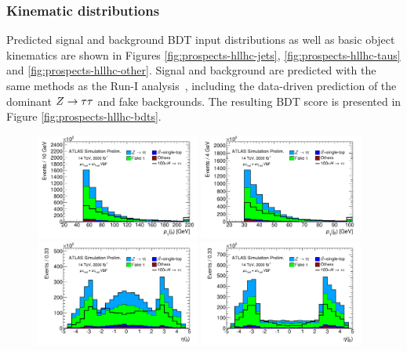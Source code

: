 \subsubsection{Kinematic distributions}

Predicted signal and background BDT input distributions as well as basic object kinematics are shown in Figures \cref{fig:prospects-hllhc-jets}, \cref{fig:prospects-hllhc-taus} and \cref{fig:prospects-hllhc-other}. Signal and background are predicted with the same methods as the Run-I analysis~\cite{HIGG-2013-32}, including the data-driven prediction of the dominant $Z\rightarrow\tau\tau$ and fake backgrounds. The resulting BDT score is presented in Figure \cref{fig:prospects-hllhc-bdts}.

\begin{figure}[tp]
  \centering
  \includegraphics[width=0.48\textwidth]{figures/ATL-PHYS-PUB-2014-018/fig_03a}
  \includegraphics[width=0.48\textwidth]{figures/ATL-PHYS-PUB-2014-018/fig_03b}
  \includegraphics[width=0.48\textwidth]{figures/ATL-PHYS-PUB-2014-018/fig_03c}
  \includegraphics[width=0.48\textwidth]{figures/ATL-PHYS-PUB-2014-018/fig_03d}

\end{figure}
